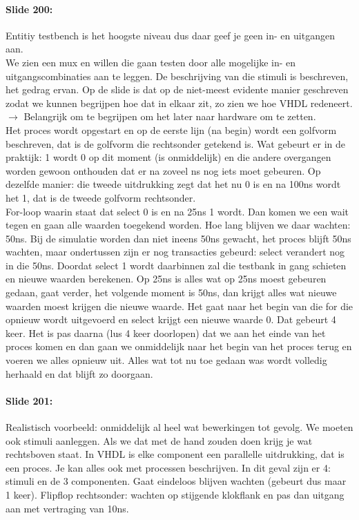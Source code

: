 \documentclass[10pt,a4paper]{book}
\begin{document}
\paragraph{Slide 200:} Entitiy testbench is het hoogste niveau dus daar geef je geen in- en uitgangen aan.\\
We zien een mux en willen die gaan testen door alle mogelijke in- en uitgangscombinaties aan te leggen. De beschrijving van die stimuli is beschreven, het gedrag ervan. Op de slide is dat op de niet-meest evidente manier geschreven zodat we kunnen begrijpen hoe dat in elkaar zit, zo zien we hoe VHDL redeneert. $\rightarrow$ Belangrijk om te begrijpen om het later naar hardware om te zetten.\\
Het proces wordt opgestart en op de eerste lijn (na begin) wordt een golfvorm beschreven, dat is de golfvorm die rechtsonder getekend is. Wat gebeurt er in de praktijk: 1 wordt 0 op dit moment (is onmiddelijk) en die andere overgangen worden gewoon onthouden dat er na zoveel ns nog iets moet gebeuren. Op dezelfde manier: die tweede uitdrukking zegt dat het nu 0 is en na 100ns wordt het 1, dat is de tweede golfvorm rechtsonder.\\
For-loop waarin staat dat select 0 is en na 25ns 1 wordt. Dan komen we een wait tegen en gaan alle waarden toegekend worden. Hoe lang blijven we daar wachten: 50ns. Bij de simulatie worden dan niet ineens 50ns gewacht, het proces blijft 50ns wachten, maar ondertussen zijn er nog transacties gebeurd: select verandert nog in die 50ns. Doordat select 1 wordt daarbinnen zal die testbank in gang schieten en nieuwe waarden berekenen. Op 25ns is alles wat op 25ns moest gebeuren gedaan, gaat verder, het volgende moment is 50ns, dan krijgt alles wat nieuwe waarden moest krijgen die nieuwe waarde. Het gaat naar het begin van die for die opnieuw wordt uitgevoerd en select krijgt een nieuwe waarde 0. Dat gebeurt 4 keer. Het is pas daarna (lus 4 keer doorlopen) dat we aan het einde van het proces komen en dan gaan we onmiddelijk naar het begin van het proces terug en voeren we alles opnieuw uit. Alles wat tot nu toe gedaan was wordt volledig herhaald en dat blijft zo doorgaan.

\paragraph{Slide 201:} Realistisch voorbeeld: onmiddelijk al heel wat bewerkingen tot gevolg. We moeten ook stimuli aanleggen. Als we dat met de hand zouden doen krijg je wat rechtsboven staat. In VHDL is elke component een parallelle uitdrukking, dat is een proces. Je kan alles ook met processen beschrijven. In dit geval zijn er 4: stimuli en de 3 componenten. Gaat eindeloos blijven wachten (gebeurt dus maar 1 keer). Flipflop rechtsonder: wachten op stijgende klokflank en pas dan uitgang aan met vertraging van 10ns.
\end{document}
